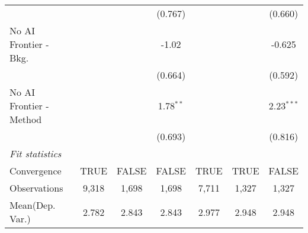 \begin{tabular}{lcccccc}
                           &              &            & (0.767)     &              &             & (0.660)\\   
   No AI Frontier - Bkg.   &              &            & -1.02       &              &             & -0.625\\   
                           &              &            & (0.664)     &              &             & (0.592)\\   
   No AI Frontier - Method &              &            & 1.78$^{**}$ &              &             & 2.23$^{***}$\\   
                           &              &            & (0.693)     &              &             & (0.816)\\   
   \midrule
   \emph{Fit statistics}\\
   Convergence             &TRUE          & FALSE      & FALSE       & TRUE         & TRUE        & FALSE\\  
   Observations            & 9,318        & 1,698      & 1,698       & 7,711        & 1,327       & 1,327\\  
Mean(Dep. Var.) & 2.782 & 2.843 & 2.843 & 2.977 & 2.948 & 2.948 \\
   

\end{tabular}
